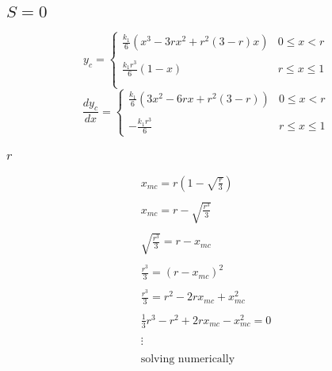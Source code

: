 \documentclass[11pt, a4paper]{article}
\begin{document}
\subsection{$S=0$}
\begin{equation}
    y_c=\left\{\begin{array}{cc}
        \displaystyle \frac{k_1}{6}\left(x^3-3rx^2+r^2\left(3-r\right)x\right) & 0\le x<r \\\\
        \displaystyle \frac{k_1r^3}{6}\left(1-x\right) & r\le x\le 1 \\\\
    \end{array}\right.
\end{equation}
\begin{equation}
    \frac{dy_c}{dx}=\left\{\begin{array}{cc}
        \displaystyle \frac{k_1}{6}\left(3x^2-6rx+r^2\left(3-r\right)\right) & 0\le x<r \\\\
        \displaystyle -\frac{k_1r^3}{6} & r\le x\le 1
    \end{array}\right.
\end{equation}

\subsubsection{$r$}
\begin{equation}
    \begin{array}{c}
        \displaystyle x_{mc}=r\left(1-\sqrt{\frac{r}{3}}\right) \\\\
        \displaystyle x_{mc}=r-\sqrt{\frac{r^3}{3}} \\\\
        \displaystyle \sqrt{\frac{r^3}{3}}=r-x_{mc} \\\\
        \displaystyle \frac{r^3}{3}=\left(r-x_{mc}\right)^2 \\\\
        \displaystyle \frac{r^3}{3}=r^2-2rx_{mc}+x_{mc}^2 \\\\
        \displaystyle \frac{1}{3}r^3-r^2+2rx_{mc}-x_{mc}^2=0 \\\\
        \vdots \\\\
        \text{solving numerically}
    \end{array}
\end{equation}
\end{document}
